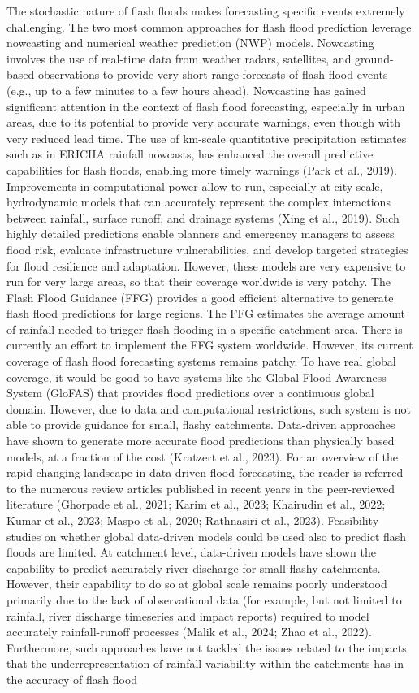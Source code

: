 The stochastic nature of flash floods makes forecasting specific events extremely challenging. The two most common approaches for flash flood prediction leverage nowcasting and numerical weather prediction (NWP) models. Nowcasting involves the use of real-time data from weather radars, satellites, and ground-based observations to provide very short-range forecasts of flash flood events (e.g., up to a few minutes to a few hours ahead). Nowcasting has gained significant attention in the context of flash flood forecasting, especially in urban areas, due to its potential to provide very accurate warnings, even though with very reduced lead time. The use of km-scale quantitative precipitation estimates such as in ERICHA rainfall nowcasts, has enhanced the overall predictive capabilities for flash floods, enabling more timely warnings (Park et al., 2019). Improvements in computational power allow to run, especially at city-scale, hydrodynamic models that can accurately represent the complex interactions between rainfall, surface runoff, and drainage systems (Xing et al., 2019). Such highly detailed predictions enable planners and emergency managers to assess flood risk, evaluate infrastructure vulnerabilities, and develop targeted strategies for flood resilience and adaptation. However, these models are very expensive to run for very large areas, so that their coverage worldwide is very patchy. The Flash Flood Guidance (FFG) provides a good efficient alternative to generate flash flood predictions for large regions. The FFG estimates the average amount of rainfall needed to trigger flash flooding in a specific catchment area. There is currently an effort to implement the FFG system worldwide. However, its current coverage of flash flood forecasting systems remains patchy. To have real global coverage, it would be good to have systems like the Global Flood Awareness System (GloFAS) that provides flood predictions over a continuous global domain. However, due to data and computational restrictions, such system is not able to provide guidance for small, flashy catchments. Data-driven approaches have shown to generate more accurate flood predictions than physically based models, at a fraction of the cost (Kratzert et al., 2023). For an overview of the rapid-changing landscape in data-driven flood forecasting, the reader is referred to the numerous review articles published in recent years in the peer-reviewed literature (Ghorpade et al., 2021; Karim et al., 2023; Khairudin et al., 2022; Kumar et al., 2023; Maspo et al., 2020; Rathnasiri et al., 2023). Feasibility studies on whether global data-driven models could be used also to predict flash floods are limited. At catchment level, data-driven models have shown the capability to predict accurately river discharge for small flashy catchments. However, their capability to do so at global scale remains poorly understood primarily due to the lack of observational data (for example, but not limited to rainfall, river discharge  timeseries and impact reports) required to model accurately rainfall-runoff processes (Malik et al., 2024; Zhao et al., 2022). Furthermore, such approaches have not tackled the issues related to the impacts that the underrepresentation of rainfall variability within the catchments has in the accuracy of flash flood 